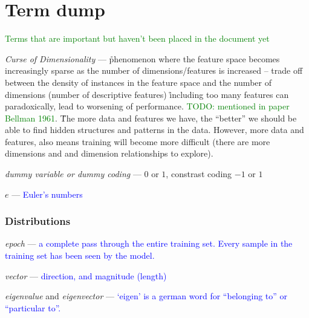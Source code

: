 \chapter{Term dump}

\textcolor{green}{Terms that are important but haven't been placed in the document yet}



\emph{Curse of Dimensionality} --- \r{phenomenon where the feature space becomes increasingly sparse as the number of dimensions/features is increased -- trade off between the density of instances in the feature space and the number of dimensions (number of descriptive features) \r{including too many features can paradoxically, lead to worsening of performance.} \textcolor{green}{TODO: mentioned in paper Bellman 1961}}. \r{The more data and features we have, the ``better'' we should be able to find hidden structures and patterns in the data. However, more data and features, also means training will become more difficult (there are more dimensions and and dimension relationships to explore).}

\emph{dummy variable or dummy coding} --- $0$ or $1$, constrast coding $-1$ or $1$



\emph{$e$} --- \textcolor{blue}{Euler's numbers}

\subsection{Distributions}



\emph{epoch} --- \textcolor{blue}{a complete pass through the entire training set. Every sample in the training set has been seen by the model.} 

\emph{vector} --- \textcolor{blue}{direction, and magnitude (length)}

\emph{eigenvalue} and \emph{eigenvector} --- \textcolor{blue}{`eigen' is a german word for ``belonging to'' or ``particular to''.} 